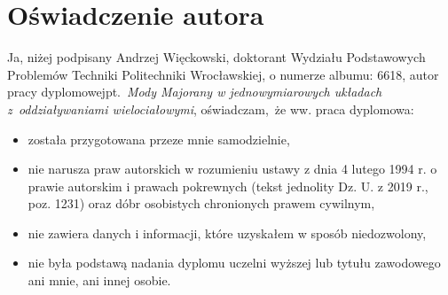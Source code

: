 \chapter*{Oświadczenie autora}

\setcounter{page}{1}

Ja, niżej podpisany Andrzej Więckowski, 
doktorant
Wydziału Podstawowych Problemów Techniki Politechniki Wrocławskiej,
o numerze albumu: 6618,
autor pracy dyplomowej\linebreak pt.~\textit{Mody Majorany w jednowymiarowych układach z~oddziaływaniami wielociałowymi}, \linebreak
oświadczam,~że ww.
praca dyplomowa:
\begin{itemize}
\item  została przygotowana przeze mnie samodzielnie,

\item nie narusza praw autorskich w rozumieniu ustawy z dnia 4 lutego 1994 r.
o prawie autorskim i prawach pokrewnych (tekst jednolity Dz. U. z 2019 r., poz. 1231) oraz dóbr osobistych chronionych prawem
cywilnym,
\item nie zawiera danych i informacji, które uzyskałem w sposób niedozwolony,
\item nie była podstawą nadania dyplomu uczelni wyższej lub tytułu zawodowego
ani mnie, ani innej osobie.
\end{itemize}



\cleardoublepage